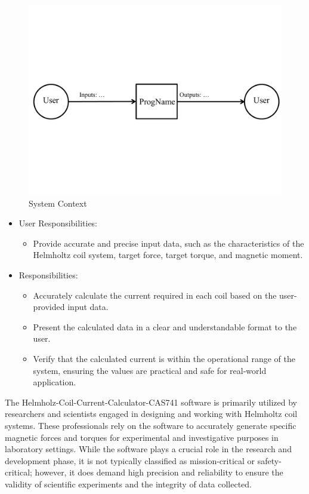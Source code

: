 \documentclass[12pt]{article}
\begin{document}
\begin{figure}[H]
\begin{center}
 \includegraphics[width=1.0\textwidth]{SystemContextFigure}
\caption{System Context}
\label{Fig_SystemContext} 
\end{center}
\end{figure}

\begin{itemize}
\item User Responsibilities:
\begin{itemize}
\item Provide accurate and precise input data, such as the characteristics of the Helmholtz coil system, target force, target torque, and magnetic moment.

\end{itemize}
\item \progname{} Responsibilities:
\begin{itemize}
\item Accurately calculate the current required in each coil based on the user-provided input data.
\item Present the calculated data in a clear and understandable format to the user.
\item Verify that the calculated current is within the operational range of the system, ensuring the values are practical and safe for real-world application.
\end{itemize}
\end{itemize}
{
The Helmholz-Coil-Current-Calculator-CAS741 software is primarily utilized by researchers and scientists engaged in designing and working with Helmholtz coil systems. These professionals rely on the software to accurately generate specific magnetic forces and torques for experimental and investigative purposes in laboratory settings. While the software plays a crucial role in the research and development phase, it is not typically classified as mission-critical or safety-critical; however, it does demand high precision and reliability to ensure the validity of scientific experiments and the integrity of data collected.
}
\end{document}
